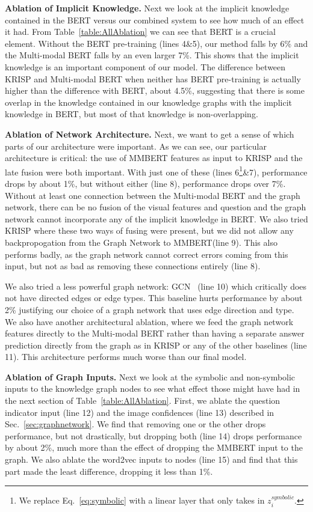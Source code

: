 \documentclass[final]{cvpr}
\providecommand{\ModelName}{KRISP\xspace}
\providecommand{\MMBERTBase}{Multi-modal BERT\xspace}
\providecommand{\MMBERTAbr}{MMBERT\xspace}
\providecommand{\myparagraph}[1]{\noindent\textbf{#1.}}
\begin{document}
\myparagraph{Ablation of Implicit Knowledge}
Next we look at the implicit knowledge contained in the BERT versus our combined system 
to see how much of an effect it had. From Table~\ref{table:AllAblation} we can see that BERT is a crucial element. Without the BERT pre-training (lines 4\&5), our method falls by 6\% and the \MMBERTBase falls by an even larger 7\%. This shows that the implicit knowledge is an important component of our model. The difference between \ModelName and \MMBERTBase when neither has BERT pre-training is actually higher than the difference with BERT, about 4.5\%, suggesting that there is some overlap in the knowledge contained in our knowledge graphs with the implicit knowledge in BERT, but most of that knowledge is non-overlapping.

\myparagraph{Ablation of Network Architecture}
Next, we want to get a sense of which parts of our architecture were important. As we can see, our particular architecture is critical: the use of \MMBERTAbr features as input to \ModelName and the late fusion were both important.
With just one of these (lines 6\footnote{We replace Eq.~\ref{eq:symbolic} with a linear layer that only takes in $z_i^{symbolic}$.}\&7), performance drops by about 1\%, but without either (line 8), performance drops over 7\%. Without at least one connection between the \MMBERTBase and the graph network, there can be no fusion of the visual features and question and the graph network cannot incorporate any of the implicit knowledge in BERT. We also tried \ModelName where these two ways of fusing were present, but we did not allow any backpropogation from the Graph Network to \MMBERTAbr (line 9). This also performs badly, as the graph network cannot correct errors coming from this input, but not as bad as removing these connections entirely (line 8).

We also tried a less powerful graph network: GCN~\cite{kipf2016semi} (line 10) which critically does not have directed edges or edge types. This baseline hurts performance by about 2\% justifying our choice of a graph network that uses edge direction and type. We also have another architectural ablation, where we feed the graph network features directly to the \MMBERTBase rather than having a separate answer prediction directly from the graph as in \ModelName or any of the other baselines (line 11). This architecture performs much worse than our final model.

\myparagraph{Ablation of Graph Inputs}
Next we look at the symbolic and non-symbolic inputs to the knowledge graph nodes to see what effect those might have had in the next section of Table~\ref{table:AllAblation}. First, we ablate the question indicator input (line 12) and the image confidences (line 13) described in Sec.~\ref{sec:graphnetwork}. We find that removing one or the other drops performance, but not drastically, but dropping both (line 14) drops performance by about 2\%, much more than the effect of dropping the \MMBERTAbr input to the graph. We also ablate the word2vec inputs to nodes (line 15) and find that this part made the least difference, dropping it less than 1\%.
\end{document}
